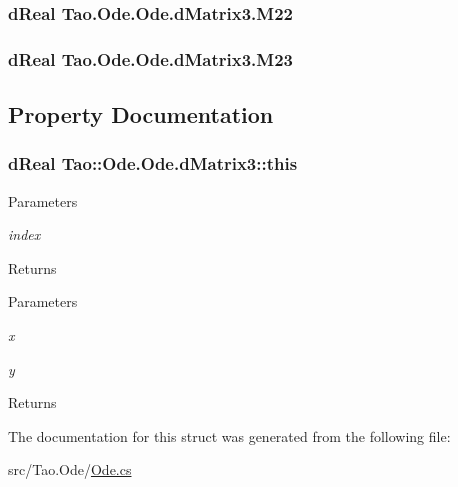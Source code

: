 \label{struct_tao_1_1_ode_1_1_ode_1_1d_matrix3_a076372e2eff2a9ad98d3420edaaf6971}
\hypertarget{struct_tao_1_1_ode_1_1_ode_1_1d_matrix3_a7686601598c8222780ae4e74ed9a3d98}{
\subsubsection[{M22}]{\setlength{\rightskip}{0pt plus 5cm}dReal {\bf Tao.Ode.Ode.dMatrix3.M22}}}
\label{struct_tao_1_1_ode_1_1_ode_1_1d_matrix3_a7686601598c8222780ae4e74ed9a3d98}
\hypertarget{struct_tao_1_1_ode_1_1_ode_1_1d_matrix3_a605d9becb363513d562684e83764b228}{
\subsubsection[{M23}]{\setlength{\rightskip}{0pt plus 5cm}dReal {\bf Tao.Ode.Ode.dMatrix3.M23}}}
\label{struct_tao_1_1_ode_1_1_ode_1_1d_matrix3_a605d9becb363513d562684e83764b228}


\subsection{Property Documentation}
\hypertarget{struct_tao_1_1_ode_1_1_ode_1_1d_matrix3_a96c362f307ebf2ecd79baf4948c68e13}{
\subsubsection[{this}]{\setlength{\rightskip}{0pt plus 5cm}dReal Tao::Ode.Ode.dMatrix3::this}}
\label{struct_tao_1_1_ode_1_1_ode_1_1d_matrix3_a96c362f307ebf2ecd79baf4948c68e13}

\begin{DoxyParams}{Parameters}
\item[{\em index}]\end{DoxyParams}
\begin{DoxyReturn}{Returns}

\end{DoxyReturn}



\begin{DoxyParams}{Parameters}
\item[{\em x}]\item[{\em y}]\end{DoxyParams}
\begin{DoxyReturn}{Returns}

\end{DoxyReturn}


The documentation for this struct was generated from the following file:\begin{DoxyCompactItemize}
\item 
src/Tao.Ode/\hyperlink{_ode_8cs}{Ode.cs}\end{DoxyCompactItemize}
